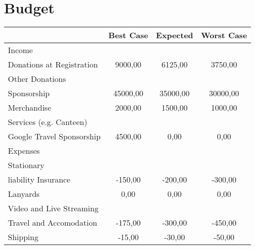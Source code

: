 
\section{Budget}

 
\begin{tabularx}{\linewidth}{XSSS}
   & {Best Case} & {Expected} & {Worst Case} \\
  \hline\hline
Income \hspace*{1em}  &  &  &  \\
\hspace*{1em} Donations at Registration  & 9000,00 & 6125,00 & 3750,00 \\
\hspace*{1em} Other Donations  &  &  &  \\
\hspace*{1em} Sponsorship  & 45000,00 & 35000,00 & 30000,00 \\
\hspace*{1em} Merchandise  & 2000,00 & 1500,00 & 1000,00 \\   
\hspace*{1em} Services (e.g. Canteen)  &  &  &  \\
\hspace*{1em} Google Travel Sponsorship  & 4500,00 & 0,00 & 0,00 \\[1ex]
Expenses \hspace*{1em}  &  &  &  \\
\hspace*{1em} Stationary  &  &  &  \\
\hspace*{1em} liability Insurance  & -150,00 & -200,00 & -300,00 \\
\hspace*{1em} Lanyards  & 0,00 & 0,00 & 0,00 \\
\hspace*{1em} Video and Live Streaming  &  &  &  \\
\hspace*{1em} \hspace*{1em} Travel and Accomodation & -175,00 & -300,00 & -450,00 \\
\hspace*{1em} \hspace*{1em} Shipping & -15,00 & -30,00 & -50,00 \\

\end{tabularx}
